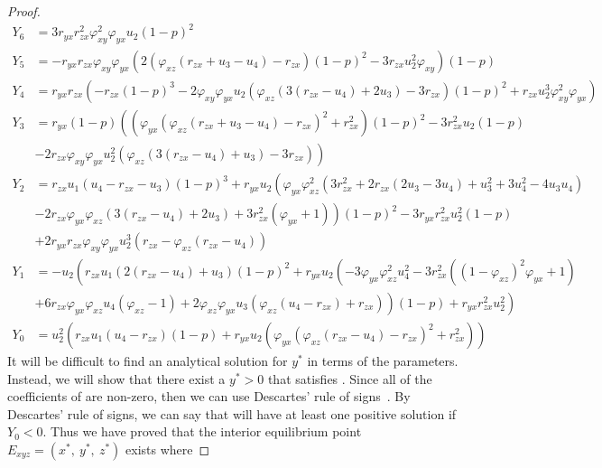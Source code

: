 \begin{proof}
\begin{align*}
        Y_6 &= 3r_{yx}r_{zx}^2\varphi_{xy}^2\varphi_{yx}u_2\left(1-p\right)^2\\
        Y_5 &= -r_{yx}r_{zx}\varphi_{xy}\varphi_{yx}\left(2\left(\varphi_{xz}\left(r_{zx}+u_3-u_4\right)-r_{zx}\right)\left(1-p\right)^2-3r_{zx}u_2^2\varphi_{xy}\right)\left(1-p\right)\\
        Y_4 &= r_{yx}r_{zx}\left(-r_{zx}\left(1-p\right)^3-2\varphi_{xy}\varphi_{yx}u_2\left(\varphi_{xz}\left(3\left(r_{zx}-u_4\right)+2u_3\right)-3r_{zx}\right)\left(1-p\right)^2+r_{zx}u_2^3\varphi_{xy}^2\varphi_{yx}\right)\\
        Y_3 &= r_{yx}\left(1-p\right)\left(\left(\varphi_{yx}\left(\varphi_{xz}\left(r_{zx}+u_3-u_4\right)-r_{zx}\right)^2+r_{zx}^2\right)\left(1-p\right)^2-3r_{zx}^2u_2\left(1-p\right)\right.\\
        &\left.-2r_{zx}\varphi_{xy}\varphi_{yx}u_2^2\left(\varphi_{xz}\left(3\left(r_{zx}-u_4\right)+u_3\right)-3r_{zx}\right)\right)\\
        Y_2 &= r_{zx}u_1\left(u_4-r_{zx}-u_3\right)\left(1-p\right)^3+r_{yx}u_2\left(\varphi_{yx}\varphi_{xz}^2\left(3r_{zx}^2+2r_{zx}\left(2u_3-3u_4\right)+u_3^2+3u_4^2-4u_3u_4\right)\right.\\
        &\left.-2r_{zx}\varphi_{yx}\varphi_{xz}\left(3\left(r_{zx}-u_4\right)+2u_3\right)+3r_{zx}^2\left(\varphi_{yx}+1\right)\right)\left(1-p\right)^2-3r_{yx}r_{zx}^2u_2^2\left(1-p\right)\\
        &+2r_{yx}r_{zx}\varphi_{xy}\varphi_{yx}u_2^3\left(r_{zx}-\varphi_{xz}\left(r_{zx}-u_4\right)\right)\\
        Y_1 &= -u_2\left(r_{zx}u_1\left(2\left(r_{zx}-u_4\right)+u_3\right)\left(1-p\right)^2+r_{yx}u_2\left(-3\varphi_{yx}\varphi_{xz}^2u_4^2-3r_{zx}^2\left(\left(1-\varphi_{xz}\right)^2\varphi_{yx}+1\right)\right.\right.\\
        &\left.\left.+6r_{zx}\varphi_{yx}\varphi_{xz}u_4\left(\varphi_{xz}-1\right)+2\varphi_{xz}\varphi_{yx}u_3\left(\varphi_{xz}\left(u_4-r_{zx}\right)+r_{zx}\right)\right)\left(1-p\right)+r_{yx}r_{zx}^2u_2^2 \right)\\
        Y_0 &= u_2^2\left(r_{zx}u_1\left(u_4-r_{zx}\right)\left(1-p\right)+r_{yx}u_2\left(\varphi_{yx}\left(\varphi_{xz}\left(r_{zx}-u_4\right)-r_{zx}\right)^2+r_{zx}^2\right)\right)
    \end{align*}
    It will be difficult to find an analytical solution for $y^*$ in terms of the parameters. Instead, we will show that there exist a $y^*>0$ that satisfies . Since all of the coefficients of  are non-zero, then we can use Descartes' rule of signs~\cite{WANG2004525526}. By Descartes' rule of signs, we can say that  will have at least one positive solution if $Y_0<0$. Thus we have proved that the interior equilibrium point $E_{xyz}=\left(x^*,\ y^*,\ z^*\right)$ exists where

\end{proof}
